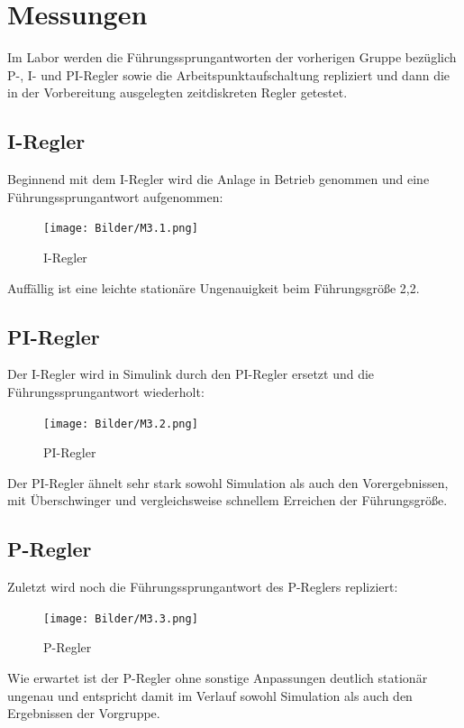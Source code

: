 \documentclass{report}
\begin{document}

\section{Messungen}
\textmd{Im Labor werden die Führungssprungantworten der vorherigen Gruppe bezüglich P-, I- und PI-Regler sowie die Arbeitspunktaufschaltung repliziert und dann die in der Vorbereitung ausgelegten zeitdiskreten Regler getestet.}


\subsection{I-Regler}
\textmd{Beginnend mit dem I-Regler wird die Anlage in Betrieb genommen und eine Führungssprungantwort aufgenommen:}
\begin{figure}[H]
	\centering
	\texttt{[image: Bilder/M3.1.png]}
	\caption{I-Regler}
	\label{fig:M3.1.png}
\end{figure}
\textmd{Auffällig ist eine leichte stationäre Ungenauigkeit beim Führungsgröße 2,2.}


\subsection{PI-Regler}
\textmd{Der I-Regler wird in Simulink durch den PI-Regler ersetzt und die Führungssprungantwort wiederholt:}
\begin{figure}[H]
	\centering
	\texttt{[image: Bilder/M3.2.png]}
	\caption{PI-Regler}
	\label{fig:M3.2.png}
\end{figure}
\textmd{Der PI-Regler ähnelt sehr stark sowohl Simulation als auch den Vorergebnissen, mit Überschwinger und vergleichsweise schnellem Erreichen der Führungsgröße.}

\subsection{P-Regler}
\textmd{Zuletzt wird noch die Führungssprungantwort des P-Reglers repliziert:}
\begin{figure}[H]
	\centering
	\texttt{[image: Bilder/M3.3.png]}
	\caption{P-Regler}
	\label{fig:M3.3.png}
\end{figure}
\textmd{Wie erwartet ist der P-Regler ohne sonstige Anpassungen deutlich stationär ungenau und entspricht damit im Verlauf sowohl Simulation als auch den Ergebnissen der Vorgruppe.}
\end{document}
